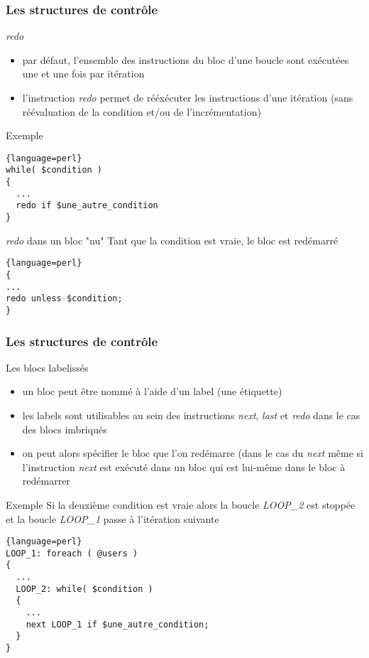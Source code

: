 \begin{frame}[fragile]
  \frametitle{Les structures de contrôle}

  \begin{block}{\textit{redo}}
    \begin{itemize}
    \item par défaut, l'ensemble des instructions du bloc d'une boucle sont
      exécutées une et une fois par itération
    \item l'instruction \textit{redo} permet de rééxécuter les instructions
      d'une itération (sans réévaluation de la condition et/ou de
      l'incrémentation)
    \end{itemize}
  \end{block}

  \begin{exampleblock}{Exemple}
    \begin{lstlisting}{language=perl}
while( $condition )
{
  ...
  redo if $une_autre_condition
}
    \end{lstlisting}
  \end{exampleblock}

  \begin{alertblock}{\textit{redo} dans un bloc "nu"}
    Tant que la condition est vraie, le bloc est redémarré
    \begin{lstlisting}{language=perl}
{
...
redo unless $condition;
}
    \end{lstlisting}
  \end{alertblock}
\end{frame}

\begin{frame}[fragile]
  \frametitle{Les structures de contrôle}

  \begin{block}{Les blocs labelissés}
    \begin{itemize}
    \item un bloc peut être nommé à l'aide d'un label (une étiquette)
    \item les labels sont utilisables au sein des instructions \textit{next},
      \textit{last} et \textit{redo} dans le cas des blocs imbriqués
    \item on peut alors spécifier le bloc que l'on redémarre (dans le cas du
      \textit{next} même si l'instruction \textit{next} est exécuté dans un bloc
      qui est lui-même dans le bloc à redémarrer
    \end{itemize}
  \end{block}

  \begin{exampleblock}{Exemple}
    Si la deuxième condition est vraie alors la boucle \textit{LOOP\_2} est
    stoppée et la boucle \textit{LOOP\_1} passe à l'itération suivante
    \begin{lstlisting}{language=perl}
LOOP_1: foreach ( @users )
{
  ...
  LOOP_2: while( $condition )
  {
    ...
    next LOOP_1 if $une_autre_condition;
  }
}
    \end{lstlisting}
  \end{exampleblock}

\end{frame}

